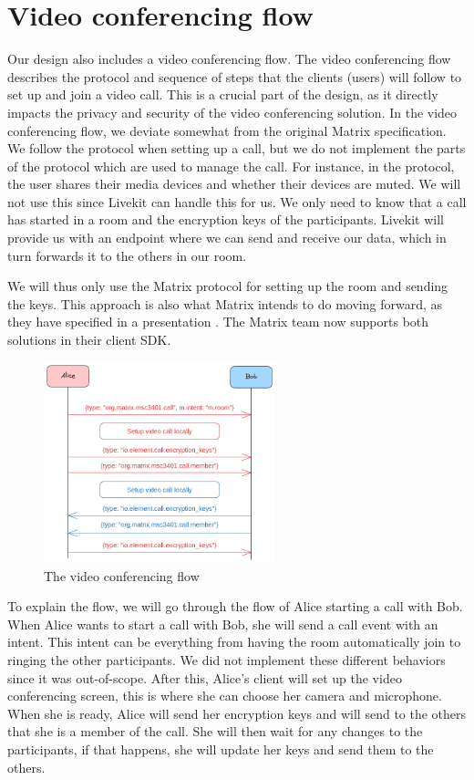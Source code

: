 \documentclass{report}
\begin{document}
\section{Video conferencing flow}
Our design also includes a video conferencing flow. The video conferencing flow describes the protocol and sequence
of steps that the clients (users) will follow to set up and join a video call.
This is a crucial part of the design, as it directly impacts the privacy and security of the video conferencing solution.
In the video conferencing flow, we deviate somewhat from the original Matrix specification. We follow the protocol
when setting up a call, but we do not implement the parts of the protocol which are used to manage the call. For
instance, in the protocol, the user shares their media devices and whether their devices are muted. We will not use
this since Livekit can handle this for us. We only need to know that a call has started in a room and the encryption
keys of the participants. Livekit will provide us with an endpoint where we can send and receive our data, which in
turn forwards it to the others in our room.

We will thus only use the Matrix protocol for setting up the room and sending the keys. This approach is also what
Matrix intends to do moving forward, as they have specified in a presentation \cite{nirve_matrixrtc_nodate}. The
Matrix team now supports both solutions in their client SDK.

\begin{figure}
\centering
\includegraphics[width=0.6\textwidth]{img/Callflow.excalidraw.png}
\caption{The video conferencing flow}
\label{fig:video-conference-flow}
\end{figure}

To explain the flow, we will go through the flow of Alice starting a call with Bob.
When Alice wants to start a call with Bob, she will send a call event with an intent. This intent can be
everything from having the room automatically join to ringing the other participants. We did not implement
these different behaviors since it was out-of-scope. After this, Alice's client will set up the video conferencing
screen, this is where she can choose her camera and microphone. When she is ready, Alice will send her encryption
keys and will send to the others that she is a member of the call. She will then wait for any changes to the
participants, if that happens, she will update her keys and send them to the others.
\end{document}
